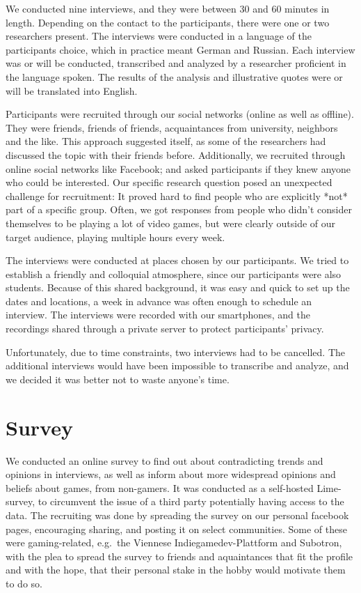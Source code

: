 \documentclass[]{vutinfth}
\begin{document}
We conducted nine interviews, and they were between 30 and 60 minutes in
length. Depending on the contact to the participants, there were one or
two researchers present. The interviews were conducted in a language of
the participants choice, which in practice meant German and Russian.
Each interview was or will be conducted, transcribed and analyzed by a
researcher proficient in the language spoken. The results of the
analysis and illustrative quotes were or will be translated into
English.

Participants were recruited through our social networks (online as well
as offline). They were friends, friends of friends, acquaintances from
university, neighbors and the like. This approach suggested itself, as
some of the researchers had discussed the topic with their friends
before. Additionally, we recruited through online social networks like
Facebook; and asked participants if they knew anyone who could be
interested. Our specific research question posed an unexpected challenge
for recruitment: It proved hard to find people who are explicitly *not*
part of a specific group. Often, we got responses from people who didn't
consider themselves to be playing a lot of video games, but were clearly
outside of our target audience, playing multiple hours every week.

The interviews were conducted at places chosen by our participants. We
tried to establish a friendly and colloquial atmosphere, since our
participants were also students. Because of this shared background, it
was easy and quick to set up the dates and locations, a week in advance
was often enough to schedule an interview. The interviews were recorded
with our smartphones, and the recordings shared through a private server
to protect participants' privacy.

Unfortunately, due to time constraints, two interviews had to be
cancelled. The additional interviews would have been impossible to
transcribe and analyze, and we decided it was better not to waste
anyone's time.

\hypertarget{survey}{%
\section{Survey}\label{survey}}

We conducted an online survey to find out about contradicting trends and
opinions in interviews, as well as inform about more widespread opinions
and beliefs about games, from non-gamers. It was conducted as a
self-hosted Lime-survey, to circumvent the issue of a third party
potentially having access to the data. The recruiting was done by
spreading the survey on our personal facebook pages, encouraging
sharing, and posting it on select communities. Some of these were
gaming-related, e.g.~the Viennese Indiegamedev-Plattform and Subotron,
with the plea to spread the survey to friends and aquaintances that fit
the profile and with the hope, that their personal stake in the hobby
would motivate them to do so.
\end{document}
